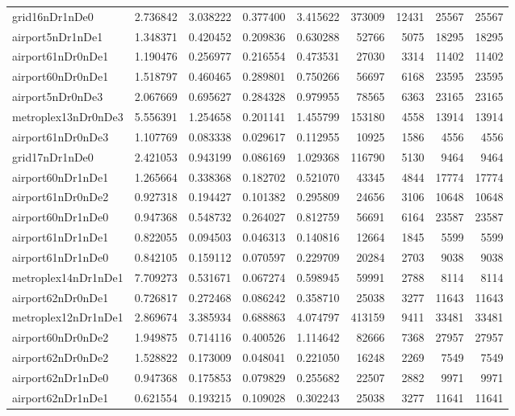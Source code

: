 \begin{longtable}{|l|r|r|r|r|r|r|r|r|}
grid16nDr1nDe0 & 2.736842 & 3.038222 & 0.377400 & 3.415622 & 373009 & 12431 & 25567 & 25567 \\
airport5nDr1nDe1 & 1.348371 & 0.420452 & 0.209836 & 0.630288 & 52766 & 5075 & 18295 & 18295 \\
airport61nDr0nDe1 & 1.190476 & 0.256977 & 0.216554 & 0.473531 & 27030 & 3314 & 11402 & 11402 \\
airport60nDr0nDe1 & 1.518797 & 0.460465 & 0.289801 & 0.750266 & 56697 & 6168 & 23595 & 23595 \\
airport5nDr0nDe3 & 2.067669 & 0.695627 & 0.284328 & 0.979955 & 78565 & 6363 & 23165 & 23165 \\
metroplex13nDr0nDe3 & 5.556391 & 1.254658 & 0.201141 & 1.455799 & 153180 & 4558 & 13914 & 13914 \\
airport61nDr0nDe3 & 1.107769 & 0.083338 & 0.029617 & 0.112955 & 10925 & 1586 & 4556 & 4556 \\
grid17nDr1nDe0 & 2.421053 & 0.943199 & 0.086169 & 1.029368 & 116790 & 5130 & 9464 & 9464 \\
airport60nDr1nDe1 & 1.265664 & 0.338368 & 0.182702 & 0.521070 & 43345 & 4844 & 17774 & 17774 \\
airport61nDr0nDe2 & 0.927318 & 0.194427 & 0.101382 & 0.295809 & 24656 & 3106 & 10648 & 10648 \\
airport60nDr1nDe0 & 0.947368 & 0.548732 & 0.264027 & 0.812759 & 56691 & 6164 & 23587 & 23587 \\
airport61nDr1nDe1 & 0.822055 & 0.094503 & 0.046313 & 0.140816 & 12664 & 1845 & 5599 & 5599 \\
airport61nDr1nDe0 & 0.842105 & 0.159112 & 0.070597 & 0.229709 & 20284 & 2703 & 9038 & 9038 \\
metroplex14nDr1nDe1 & 7.709273 & 0.531671 & 0.067274 & 0.598945 & 59991 & 2788 & 8114 & 8114 \\
airport62nDr0nDe1 & 0.726817 & 0.272468 & 0.086242 & 0.358710 & 25038 & 3277 & 11643 & 11643 \\
metroplex12nDr1nDe1 & 2.869674 & 3.385934 & 0.688863 & 4.074797 & 413159 & 9411 & 33481 & 33481 \\
airport60nDr0nDe2 & 1.949875 & 0.714116 & 0.400526 & 1.114642 & 82666 & 7368 & 27957 & 27957 \\
airport62nDr0nDe2 & 1.528822 & 0.173009 & 0.048041 & 0.221050 & 16248 & 2269 & 7549 & 7549 \\
airport62nDr1nDe0 & 0.947368 & 0.175853 & 0.079829 & 0.255682 & 22507 & 2882 & 9971 & 9971 \\
airport62nDr1nDe1 & 0.621554 & 0.193215 & 0.109028 & 0.302243 & 25038 & 3277 & 11641 & 11641 \\

\end{longtable}
